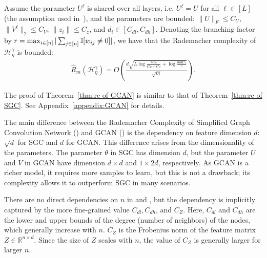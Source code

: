 \begin{theorem}\label{thm:rc of GCAN}
    Assume the parameter $U^\ell$ is shared over all layers, i.e. $U^\ell = U$ for all $\ell \in [L]$ (the assumption used in~\cite{garg2020generaliz}), and the parameters are bounded: $\|U\|_F \leq C_U$, $\|V^\ell\|_2 \leq C_V$, $\|z_i\|\leq C_z$, and $d_i \in [C_{dl}, C_{dh}]$. Denoting the branching factor by $r = \max_{i \in [n]} |\sum_{j \in [n]}\mathbb{I}[w_{ij} \neq 0]|$, we have that 
    the Rademacher complexity of $\mathcal{H}^\gamma_{\eta}$ is bounded:
    \begin{align*}
        \hat R_{m}(\mathcal{H}^\gamma_{\eta})
        = O\left( \frac{d\sqrt{L\log \frac{rC_U}{C_{dl} + C_U} + \log\frac{mdC_z}{\gamma}}}{\sqrt{m}} \right).
    \end{align*}
\end{theorem}
\noindent The proof of Theorem~\ref{thm:rc of GCAN} is similar to that of Theorem~\ref{thm:rc of SGC}. See Appendix~\ref{appendix:GCAN} for details.
\begin{remark}
    The main difference between the Rademacher Complexity of Simplified Graph Convolution Network () and GCAN () is the dependency on feature dimension $d$: $\sqrt{d}$ for SGC and $d$ for GCAN. This difference arises from the dimensionality of the parameters. The parameter $\theta$ in SGC has dimension $d$, but the parameter $U$ and $V$ in GCAN have dimension $d \times d$ and $1 \times 2d$, respectively. As GCAN is a richer model, it requires more samples to learn, but this is not a drawback; its complexity allows it to outperform SGC in many scenarios. 
\end{remark}
\begin{remark}
    There are no direct dependencies on $n$ in  and , but the dependency is implicitly captured by the more fine-grained value $C_{dl}, C_{dh}$, and $C_Z$. Here, $C_{dl}$ and $C_{dh}$ are the lower and upper bounds of the degree (number of neighbors) of the nodes, which generally increase with $n$.
    $C_Z$ is the Frobenius norm of the feature matrix $Z \in \mathbb{R}^{n \times d}$. Since the size of $Z$ scales with $n$, the value of $C_Z$ is generally larger for larger $n$.
\end{remark}